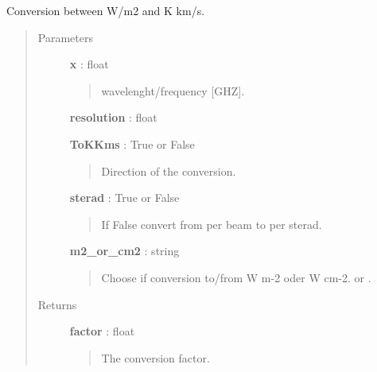 \documentclass[a4paper,10pt,english]{sphinxmanual}
\begin{document}
\begin{fulllineitems}
\label{functions:astrolyze.functions.units.WmToKkms}
Conversion between W/m2 and K km/s.
\begin{quote}\begin{description}
\item[{Parameters }] \leavevmode
\textbf{x} : float
\begin{quote}

wavelenght/frequency {[}GHZ{]}.
\end{quote}

\textbf{resolution} : float

\textbf{ToKKms} : True or False
\begin{quote}

Direction of the conversion.
\end{quote}

\textbf{sterad} : True or False
\begin{quote}

If False convert from per beam to per sterad.
\end{quote}

\textbf{m2\_or\_cm2} : string
\begin{quote}

Choose if conversion to/from W m-2 oder W cm-2.  or .
\end{quote}

\item[{Returns }] \leavevmode
\textbf{factor} : float
\begin{quote}

The conversion factor.
\end{quote}

\end{description}\end{quote}

\end{fulllineitems}

\end{document}
